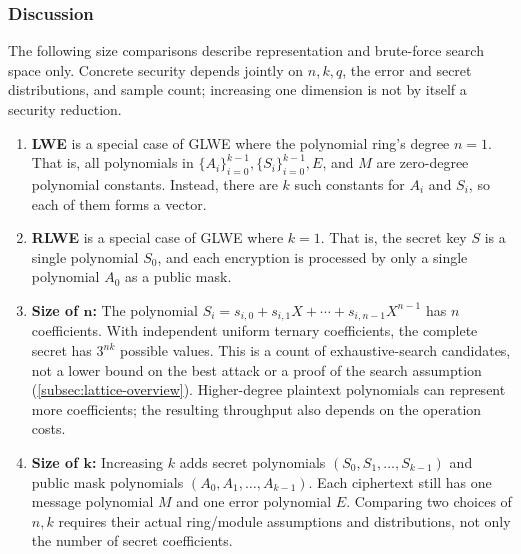 \subsubsection{Discussion}

The following size comparisons describe representation and brute-force search space only. Concrete security depends jointly on $n,k,q$, the error and secret distributions, and sample count; increasing one dimension is not by itself a security reduction.
\begin{enumerate}
\item \textbf{LWE} is a special case of GLWE where the polynomial ring's degree $n = 1$. That is, all polynomials in $\{A_i\}_{i=0}^{k-1}, \{S_i\}_{i=0}^{k-1}, E$, and $M$ are zero-degree polynomial constants. Instead, there are $k$ such constants for $A_i$ and $S_i$, so each of them forms a vector.
\item \textbf{RLWE} is a special case of GLWE where $k = 1$. That is, the secret key $S$ is a single polynomial $S_0$, and each encryption is processed by only a single polynomial $A_0$ as a public mask.
\item \textbf{Size of $\bm{n}$:} The polynomial $S_i = s_{i,0} + s_{i,1}X + \cdots + s_{i, n-1}X^{n-1} $ has $n$ coefficients. With independent uniform ternary coefficients, the complete secret has $3^{nk}$ possible values. This is a count of exhaustive-search candidates, not a lower bound on the best attack or a proof of the search assumption (\autoref{subsec:lattice-overview}). Higher-degree plaintext polynomials can represent more coefficients; the resulting throughput also depends on the operation costs.
\item \textbf{Size of $\bm{k}$:} Increasing $k$ adds secret polynomials $(S_0, S_1, \ldots, S_{k-1})$ and public mask polynomials $(A_0, A_1,\ldots, A_{k-1})$. Each ciphertext still has one message polynomial $M$ and one error polynomial $E$. Comparing two choices of $n,k$ requires their actual ring/module assumptions and distributions, not only the number of secret coefficients.

\end{enumerate}
